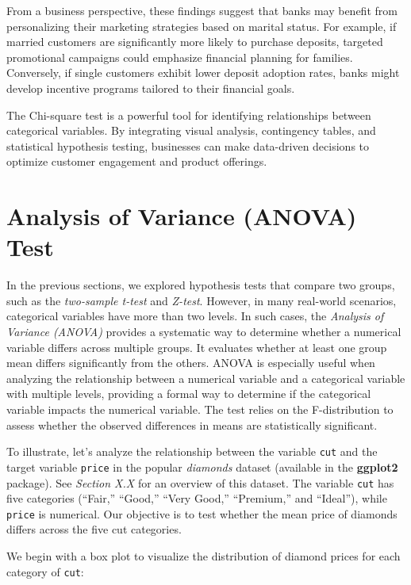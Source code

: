 \documentclass[
  11pt,
]{book}
\theoremstyle{definition}
\theoremstyle{definition}
\theoremstyle{definition}
\theoremstyle{definition}
\theoremstyle{remark}
\begin{document}
From a business perspective, these findings suggest that banks may benefit from personalizing their marketing strategies based on marital status. For example, if married customers are significantly more likely to purchase deposits, targeted promotional campaigns could emphasize financial planning for families. Conversely, if single customers exhibit lower deposit adoption rates, banks might develop incentive programs tailored to their financial goals.

The Chi-square test is a powerful tool for identifying relationships between categorical variables. By integrating visual analysis, contingency tables, and statistical hypothesis testing, businesses can make data-driven decisions to optimize customer engagement and product offerings.

\section{Analysis of Variance (ANOVA) Test}\label{analysis-of-variance-anova-test}

In the previous sections, we explored hypothesis tests that compare two groups, such as the \emph{two-sample t-test} and \emph{Z-test}. However, in many real-world scenarios, categorical variables have more than two levels. In such cases, the \emph{Analysis of Variance (ANOVA)} provides a systematic way to determine whether a numerical variable differs across multiple groups. It evaluates whether at least one group mean differs significantly from the others. ANOVA is especially useful when analyzing the relationship between a numerical variable and a categorical variable with multiple levels, providing a formal way to determine if the categorical variable impacts the numerical variable. The test relies on the F-distribution to assess whether the observed differences in means are statistically significant.

To illustrate, let's analyze the relationship between the variable \texttt{cut} and the target variable \texttt{price} in the popular \emph{diamonds} dataset (available in the \textbf{ggplot2} package). See \emph{Section X.X} for an overview of this dataset. The variable \texttt{cut} has five categories (``Fair,'' ``Good,'' ``Very Good,'' ``Premium,'' and ``Ideal''), while \texttt{price} is numerical. Our objective is to test whether the mean price of diamonds differs across the five cut categories.

We begin with a box plot to visualize the distribution of diamond prices for each category of \texttt{cut}:
\end{document}
